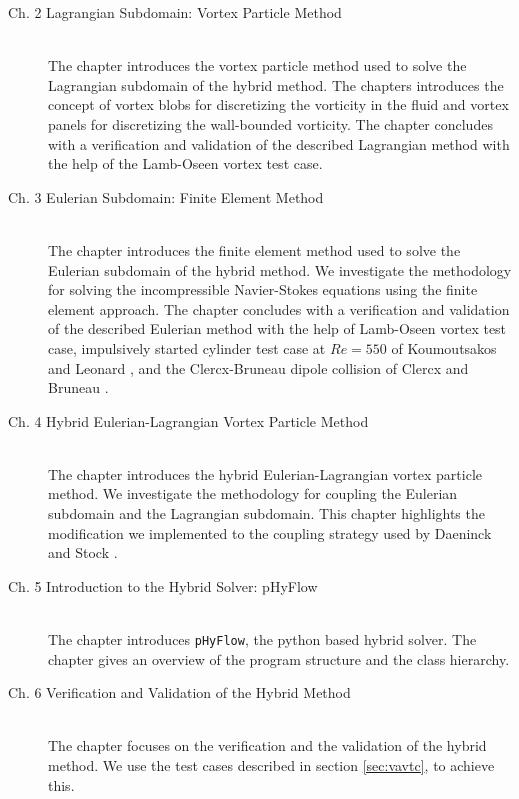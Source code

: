 \begin{description}
\item[Ch. 2 \qquad Lagrangian Subdomain: Vortex Particle Method]\hfill\\
The chapter introduces the vortex particle method used to solve the Lagrangian subdomain of the hybrid method. The chapters introduces the concept of vortex blobs for discretizing the vorticity in the fluid and vortex panels for discretizing the wall-bounded vorticity. The chapter concludes with a verification and validation of the described Lagrangian method with the help of the Lamb-Oseen vortex test case.

\item[Ch. 3 \qquad Eulerian Subdomain: Finite Element Method]\hfill\\
The chapter introduces the finite element method used to solve the Eulerian subdomain of the hybrid method. We investigate the methodology for solving the incompressible Navier-Stokes equations using the finite element approach. The chapter concludes with a verification and validation of the described Eulerian method with the help of Lamb-Oseen vortex test case, impulsively started cylinder test case at $Re=550$ of Koumoutsakos and Leonard \cite{Koumoutsakos1995a}, and the Clercx-Bruneau dipole collision of Clercx and Bruneau \cite{Clercx2006a}.

\item[Ch. 4 \qquad Hybrid Eulerian-Lagrangian Vortex Particle Method]\hfill\\
The chapter introduces the hybrid Eulerian-Lagrangian vortex particle method. We investigate the methodology for coupling the Eulerian subdomain and the Lagrangian subdomain. This chapter highlights the modification we implemented to the coupling strategy used by Daeninck \cite{Daeninck2006} and Stock \cite{Stock2010a}.

\item[Ch. 5 \qquad Introduction to the Hybrid Solver: pHyFlow]\hfill\\
The chapter introduces \texttt{pHyFlow}, the python based hybrid solver. The chapter gives an overview of the program structure and the class hierarchy.

\item[Ch. 6 \qquad Verification and Validation of the Hybrid Method]\hfill\\
The chapter focuses on the verification and the validation of the hybrid method. We use the test cases described in section \ref{sec:vavtc}, to achieve this.

\end{description}

